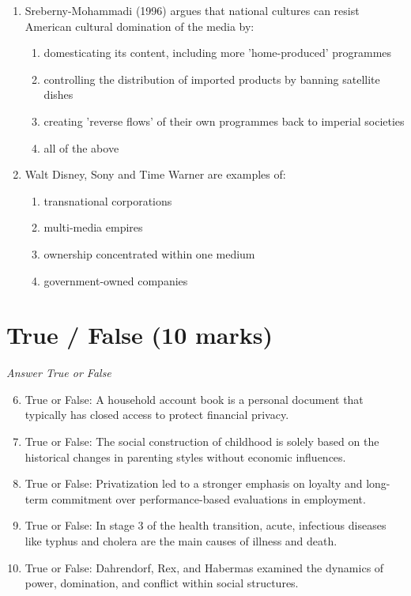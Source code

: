 \documentclass[12pt]{article}
\begin{document}
\begin{enumerate}[label=\arabic*.]
\begin{enumerate}[label=(\alph*)]
\end{enumerate}
\item Sreberny-Mohammadi (1996) argues that national cultures can resist American cultural domination of the media by:
\begin{enumerate}[label=(\alph*)]
    \item domesticating its content, including more 'home-produced' programmes
    \item controlling the distribution of imported products by banning satellite dishes
    \item creating 'reverse flows' of their own programmes back to imperial societies
    \item all of the above
\end{enumerate}
\item Walt Disney, Sony and Time Warner are examples of:
\begin{enumerate}[label=(\alph*)]
    \item transnational corporations
    \item multi-media empires
    \item ownership concentrated within one medium
    \item government-owned companies
\end{enumerate}
\end{enumerate}

\section*{True / False (10 marks)}
\textit{Answer True or False}
\begin{enumerate}[label=\arabic*.]
\setcounter{enumi}{5}
\item True or False: A household account book is a personal document that typically has closed access to protect financial privacy.
\item True or False: The social construction of childhood is solely based on the historical changes in parenting styles without economic influences.
\item True or False: Privatization led to a stronger emphasis on loyalty and long-term commitment over performance-based evaluations in employment.
\item True or False: In stage 3 of the health transition, acute, infectious diseases like typhus and cholera are the main causes of illness and death.
\item True or False: Dahrendorf, Rex, and Habermas examined the dynamics of power, domination, and conflict within social structures.
\end{enumerate}
\end{document}
